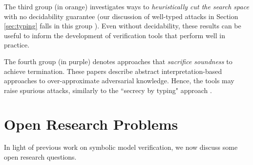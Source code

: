 \documentclass{article}
\theoremstyle{definition}
\begin{document}
The third group (in orange) investigates ways to \emph{heuristically cut the search space} with no decidability guarantee (our discussion of well-typed attacks in Section \ref{sec:typing} falls in this group \cite{typing_for_free}). Even without decidability, these results can be useful to inform the development of verification tools that perform well in practice.

The fourth group (in purple) denotes approaches that \emph{sacrifice soundness} to achieve termination. These papers describe abstract interpretation-based approaches to over-approximate adversarial knowledge. Hence, the tools may raise spurious attacks, similarly to the ``secrecy by typing" approach \cite{f7,dystar}.



\section{Open Research Problems}\label{sec:open-questions}
In light of previous work on symbolic model verification, we now discuss some open research questions.
\end{document}
